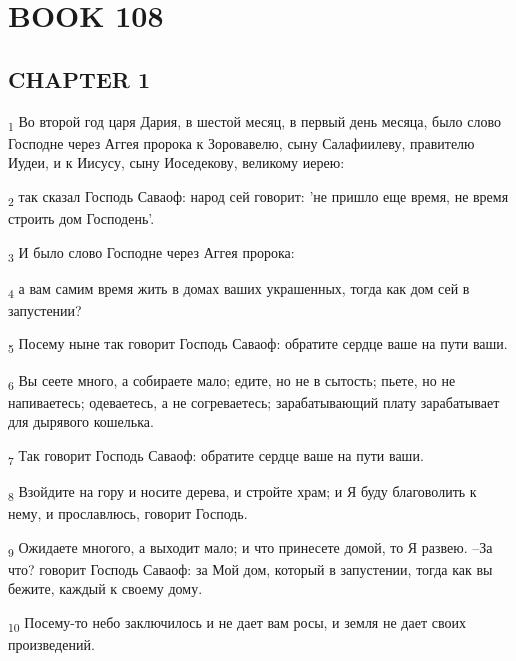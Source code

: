 \section{BOOK 108}
\subsection{CHAPTER 1}
\begin{tcolorbox}
\textsubscript{1} Во второй год царя Дария, в шестой месяц, в первый день месяца, было слово Господне через Аггея пророка к Зоровавелю, сыну Салафиилеву, правителю Иудеи, и к Иисусу, сыну Иоседекову, великому иерею:
\end{tcolorbox}
\begin{tcolorbox}
\textsubscript{2} так сказал Господь Саваоф: народ сей говорит: 'не пришло еще время, не время строить дом Господень'.
\end{tcolorbox}
\begin{tcolorbox}
\textsubscript{3} И было слово Господне через Аггея пророка:
\end{tcolorbox}
\begin{tcolorbox}
\textsubscript{4} а вам самим время жить в домах ваших украшенных, тогда как дом сей в запустении?
\end{tcolorbox}
\begin{tcolorbox}
\textsubscript{5} Посему ныне так говорит Господь Саваоф: обратите сердце ваше на пути ваши.
\end{tcolorbox}
\begin{tcolorbox}
\textsubscript{6} Вы сеете много, а собираете мало; едите, но не в сытость; пьете, но не напиваетесь; одеваетесь, а не согреваетесь; зарабатывающий плату зарабатывает для дырявого кошелька.
\end{tcolorbox}
\begin{tcolorbox}
\textsubscript{7} Так говорит Господь Саваоф: обратите сердце ваше на пути ваши.
\end{tcolorbox}
\begin{tcolorbox}
\textsubscript{8} Взойдите на гору и носите дерева, и стройте храм; и Я буду благоволить к нему, и прославлюсь, говорит Господь.
\end{tcolorbox}
\begin{tcolorbox}
\textsubscript{9} Ожидаете многого, а выходит мало; и что принесете домой, то Я развею. --За что? говорит Господь Саваоф: за Мой дом, который в запустении, тогда как вы бежите, каждый к своему дому.
\end{tcolorbox}
\begin{tcolorbox}
\textsubscript{10} Посему-то небо заключилось и не дает вам росы, и земля не дает своих произведений.
\end{tcolorbox}

